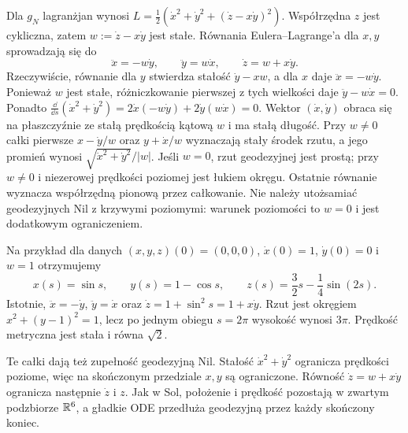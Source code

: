 \begin{przyklad}
\label{prz:thur-dop-geodezyjne-nil}
Dla $g_N$ lagranżjan wynosi
$L=\tfrac12(\dot x^2+\dot y^2+(\dot z-x\dot y)^2)$.
Współrzędna $z$ jest cykliczna, zatem
$w:=\dot z-x\dot y$ jest stałe. Równania
Eulera--Lagrange'a dla $x,y$ sprowadzają się do
\begin{equation}\label{eq:thur-dop-nil-geodezyjne}
 \ddot x=-w\dot y,\qquad \ddot y=w\dot x,
 \qquad \dot z=w+x\dot y.
\end{equation}
Rzeczywiście, równanie dla $y$ stwierdza stałość
$\dot y-xw$, a dla $x$ daje $\ddot x=-w\dot y$.
Ponieważ $w$ jest stałe, różniczkowanie pierwszej
z tych wielkości daje $\ddot y-w\dot x=0$.
Ponadto
$\frac{\dd}{\dd s}(\dot x^2+\dot y^2)
=2\dot x(-w\dot y)+2\dot y(w\dot x)=0$.
Wektor $(\dot x,\dot y)$ obraca się na płaszczyźnie
ze stałą prędkością kątową $w$ i ma stałą długość.
Przy $w\ne0$ całki pierwsze
$x-\dot y/w$ oraz $y+\dot x/w$ wyznaczają stały środek
rzutu, a jego promień wynosi
$\sqrt{\dot x^2+\dot y^2}/|w|$.
Jeśli $w=0$, rzut geodezyjnej jest prostą;
przy $w\ne0$ i niezerowej prędkości poziomej jest łukiem okręgu.
Ostatnie równanie wyznacza współrzędną pionową przez całkowanie.
Nie należy utożsamiać geodezyjnych Nil z krzywymi poziomymi:
warunek poziomości to $w=0$ i jest dodatkowym ograniczeniem.

Na przykład dla danych $(x,y,z)(0)=(0,0,0)$,
$\dot x(0)=1$, $\dot y(0)=0$ i $w=1$ otrzymujemy
\[
 x(s)=\sin s,\qquad y(s)=1-\cos s,\qquad
 z(s)=\frac32s-\frac14\sin(2s).
\]
Istotnie, $\ddot x=-\dot y$, $\ddot y=\dot x$ oraz
$\dot z=1+\sin^2s=1+x\dot y$.
Rzut jest okręgiem $x^2+(y-1)^2=1$,
lecz po jednym obiegu $s=2\pi$ wysokość wynosi $3\pi$.
Prędkość metryczna jest stała i równa $\sqrt2$.

Te całki dają też zupełność geodezyjną Nil.
Stałość $\dot x^2+\dot y^2$ ogranicza prędkości poziome,
więc na skończonym przedziale $x,y$ są ograniczone.
Równość $\dot z=w+x\dot y$ ogranicza następnie
$\dot z$ i $z$. Jak w Sol, położenie i prędkość
pozostają w zwartym podzbiorze $\mathbb{R}^6$, a gładkie ODE
przedłuża geodezyjną przez każdy skończony koniec.
\end{przyklad}

